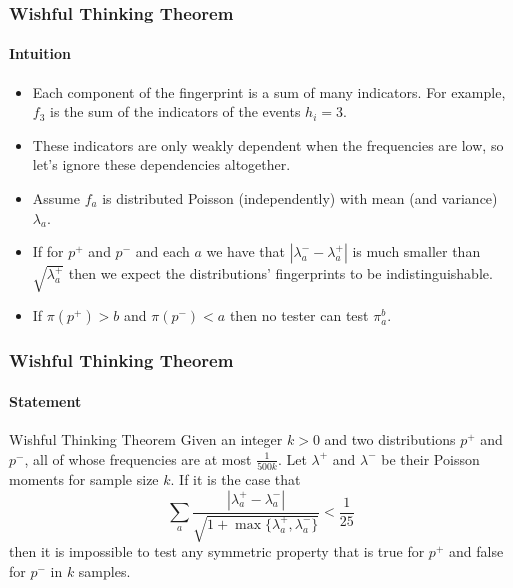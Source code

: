 \documentclass{beamer}
\begin{document}
\begin{frame}
  \frametitle{Wishful Thinking Theorem} \framesubtitle{Intuition}

  \begin{block}{}
    \begin{itemize}
    \item Each component of the fingerprint is a sum of many
      indicators. For example, $f_3$ is the sum of the indicators of
      the events $h_i=3$.
    \item These indicators are only weakly dependent when the
      frequencies are low, so let's ignore these dependencies
      altogether.
    \item Assume $f_a$ is distributed Poisson (independently) with mean
      (and variance) $\lambda_a$.
    \item If for $p^+$ and $p^-$ and each $a$ we have that
      $|\lambda^-_a-\lambda^+_a|$ is much smaller than
      $\sqrt{\lambda^+_a}$ then we expect the distributions'
      fingerprints to be indistinguishable.
    \item If $\pi(p^+)>b$ and $\pi(p^-)<a$ then no tester can test
      $\pi_a^b$.
    \end{itemize}
  \end{block}
\end{frame}


\begin{frame}
  \frametitle{Wishful Thinking Theorem} \framesubtitle{Statement}

  \begin{block}{Wishful Thinking Theorem}
    Given an integer $k>0$ and two distributions $p^+$ and $p^-$, all
    of whose frequencies are at most $\frac{1}{500k}$. Let $\lambda^+$
    and $\lambda^-$ be their Poisson moments for sample size $k$. If
    it is the case that
    \begin{equation}
      \sum_a\frac{|\lambda^+_a-\lambda^-_a|}{\sqrt{1+\max\{\lambda^+_a,\lambda^-_a\}}}<\frac{1}{25}
    \end{equation}
    then it is impossible to test any symmetric property that is true
    for $p^+$ and false for $p^-$ in $k$ samples.
  \end{block}

\end{frame}
\end{document}
